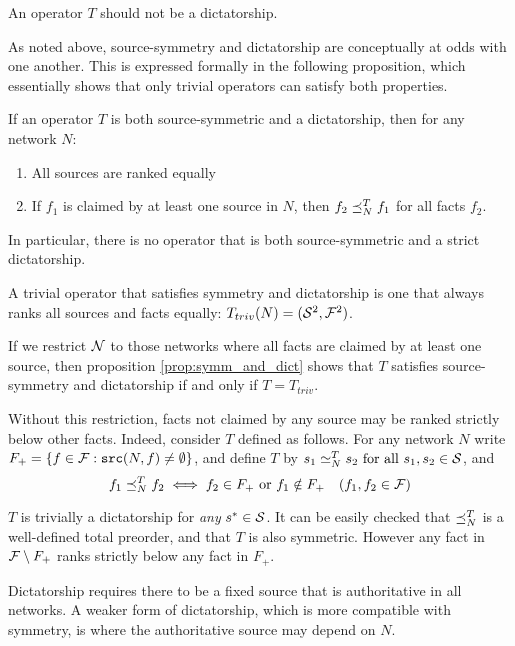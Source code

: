 \documentclass[../main.tex]{subfiles}
\begin{document}
\begin{axiom}
\label{axiom:non_dict}
An operator $T$ should not be a dictatorship.
\end{axiom}

As noted above, source-symmetry and dictatorship are conceptually at odds with
one another. This is expressed formally in the following proposition, which
essentially shows that only trivial operators can satisfy both properties.

\begin{proposition}
\label{prop:symm_and_dict}

If an operator $T$ is both source-symmetric and a dictatorship, then for any
network $N$:
\begin{enumerate}
\item All sources are ranked equally
\item If $f_1$ is claimed by at least one source in $N$, then $f_2 \fle_N^T
f_1$ for all facts $f_2$.
\end{enumerate}

In particular, there is no operator that is both source-symmetric and a strict
dictatorship.
\end{proposition}

\begin{example}
A trivial operator that satisfies symmetry and dictatorship is one that always
ranks all sources and facts equally: $T_{triv}(N) = (\S^2, \F^2)$.

If we restrict $\N$ to those networks where all facts are claimed by
at least one source, then proposition \ref{prop:symm_and_dict} shows that $T$
satisfies source-symmetry and dictatorship if and only if $T=T_{triv}$.

Without this restriction, facts not claimed by any source may be ranked
strictly below other facts. Indeed, consider $T$ defined as follows. For any
network $N$ write $F_{+} = \{f \in \F : \src(N, f) \ne \emptyset \}$, and
define $T$ by $s_1 \seq_N^{T} s_2 \text{ for all } s_1, s_2 \in \S$, and
$$
    f_1 \fle_N^{T} f_2 \iff f_2 \in F_{+} \text{ or } f_1 \notin F_{+}
    \quad
    (f_1, f_2 \in \F)
$$

$T$ is trivially a dictatorship for \emph{any} $s^* \in \S$. It can be easily
checked that $\fle_N^T$ is a well-defined total preorder, and that $T$ is also
symmetric. However any fact in $\F \setminus F_+$ ranks strictly below any fact
in $F_+$.
\end{example}

Dictatorship requires there to be a fixed source that is authoritative
in all networks. A weaker form of dictatorship, which is more compatible with
symmetry, is where the authoritative source may depend on $N$.
\end{document}
